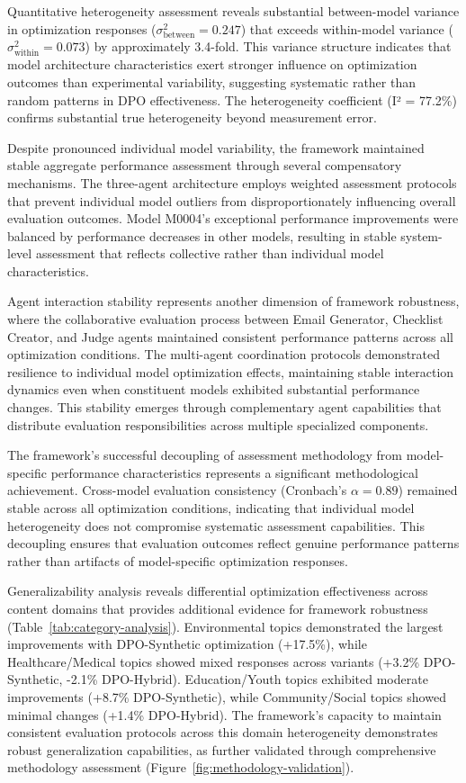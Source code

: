 Quantitative heterogeneity assessment reveals substantial between-model variance in optimization responses ($\sigma^2_{\text{between}} = 0.247$) that exceeds within-model variance ($\sigma^2_{\text{within}} = 0.073$) by approximately 3.4-fold. This variance structure indicates that model architecture characteristics exert stronger influence on optimization outcomes than experimental variability, suggesting systematic rather than random patterns in DPO effectiveness. The heterogeneity coefficient (I² = 77.2\%) confirms substantial true heterogeneity beyond measurement error.

Despite pronounced individual model variability, the framework maintained stable aggregate performance assessment through several compensatory mechanisms. The three-agent architecture employs weighted assessment protocols that prevent individual model outliers from disproportionately influencing overall evaluation outcomes. Model M0004's exceptional performance improvements were balanced by performance decreases in other models, resulting in stable system-level assessment that reflects collective rather than individual model characteristics.

Agent interaction stability represents another dimension of framework robustness, where the collaborative evaluation process between Email Generator, Checklist Creator, and Judge agents maintained consistent performance patterns across all optimization conditions. The multi-agent coordination protocols demonstrated resilience to individual model optimization effects, maintaining stable interaction dynamics even when constituent models exhibited substantial performance changes. This stability emerges through complementary agent capabilities that distribute evaluation responsibilities across multiple specialized components.

The framework's successful decoupling of assessment methodology from model-specific performance characteristics represents a significant methodological achievement. Cross-model evaluation consistency (Cronbach's $\alpha = 0.89$) remained stable across all optimization conditions, indicating that individual model heterogeneity does not compromise systematic assessment capabilities. This decoupling ensures that evaluation outcomes reflect genuine performance patterns rather than artifacts of model-specific optimization responses.

Generalizability analysis reveals differential optimization effectiveness across content domains that provides additional evidence for framework robustness (Table~\ref{tab:category-analysis}). Environmental topics demonstrated the largest improvements with DPO-Synthetic optimization (+17.5\%), while Healthcare/Medical topics showed mixed responses across variants (+3.2\% DPO-Synthetic, -2.1\% DPO-Hybrid). Education/Youth topics exhibited moderate improvements (+8.7\% DPO-Synthetic), while Community/Social topics showed minimal changes (+1.4\% DPO-Hybrid). The framework's capacity to maintain consistent evaluation protocols across this domain heterogeneity demonstrates robust generalization capabilities, as further validated through comprehensive methodology assessment (Figure~\ref{fig:methodology-validation}).

